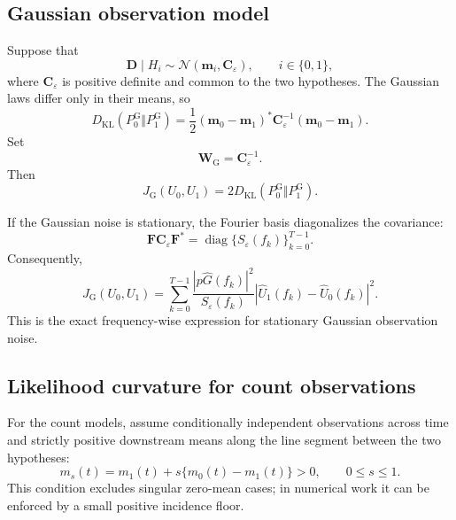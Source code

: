 \subsection{Gaussian observation model}

Suppose that
\[
\mathbf D\mid H_i
\sim
\mathcal N(\mathbf m_i,\mathbf C_\varepsilon),
\qquad i\in\{0,1\},
\]
where \(\mathbf C_\varepsilon\) is positive definite and common to the two hypotheses. The Gaussian laws differ only in their means, so
\begin{equation}
D_{\mathrm{KL}}(P_0^{\mathrm G}\Vert P_1^{\mathrm G})
=
\frac12
(\mathbf m_0-\mathbf m_1)^*
\mathbf C_\varepsilon^{-1}
(\mathbf m_0-\mathbf m_1).
\label{eq:S1-Gaussian-KL}
\end{equation}
Set
\[
\mathbf W_{\mathrm G}
=
\mathbf C_\varepsilon^{-1}.
\]
Then
\[
J_{\mathrm G}(U_0,U_1) = 2D_{\mathrm{KL}}(P_0^{\mathrm G}\Vert P_1^{\mathrm G}).
\]

If the Gaussian noise is stationary, the Fourier basis diagonalizes the covariance:
\[
\mathbf F\mathbf C_\varepsilon\mathbf F^*
=
\operatorname{diag}\{S_\varepsilon(f_k)\}_{k=0}^{T-1}.
\]
Consequently,
\[
J_{\mathrm G}(U_0,U_1) =
\sum_{k=0}^{T-1}
\frac{|p\widehat G(f_k)|^2}{S_\varepsilon(f_k)}
\left|
\widehat U_1(f_k)-\widehat U_0(f_k)
\right|^2.
\label{eq:S1-Gaussian-frequency}
\]
This is the exact frequency-wise expression for stationary Gaussian observation noise.

\subsection{Likelihood curvature for count observations}

For the count models, assume conditionally independent observations across time and strictly positive downstream means along the line segment between the two hypotheses:
\[
m_s(t)=m_1(t)+s\{m_0(t)-m_1(t)\}>0,
\qquad 0\le s\le1.
\]
This condition excludes singular zero-mean cases; in numerical work it can be enforced by a small positive incidence floor.

